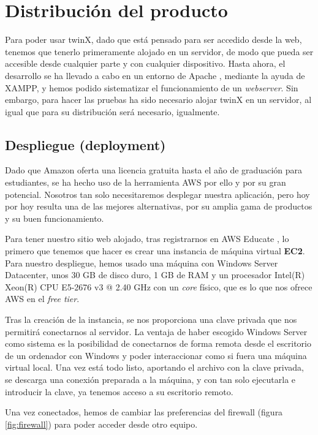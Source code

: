 \chapter{Distribución del producto}

Para poder usar twinX, dado que está pensado para ser accedido desde la web, tenemos que tenerlo primeramente alojado en un servidor, de modo que pueda ser accesible desde cualquier parte y con cualquier dispositivo. Hasta ahora, el desarrollo se ha llevado a cabo en un entorno de Apache \cite{apache}, mediante la ayuda de XAMPP, y  hemos podido sistematizar el funcionamiento de un \textit{webserver}. Sin embargo, para hacer las pruebas ha sido necesario alojar twinX en un servidor, al igual que para su distribución será necesario, igualmente.

\section{Despliegue (deployment)}

Dado que Amazon oferta una licencia gratuita hasta el año de graduación para estudiantes, se ha hecho uso de la herramienta AWS \cite{aws} por ello y por su gran potencial. Nosotros tan solo necesitaremos desplegar nuestra aplicación, pero hoy por hoy resulta una de las mejores alternativas, por su amplia gama de productos y su buen funcionamiento.

Para tener nuestro sitio web alojado, tras registrarnos en AWS Educate \cite{awseducate}, lo primero que tenemos que hacer es crear una instancia de máquina virtual \textbf{EC2}. Para nuestro despliegue, hemos usado una máquina con Windows Server Datacenter, unos 30 GB de disco duro, 1 GB de RAM y un procesador Intel(R) Xeon(R) CPU E5-2676 v3 @ 2.40 GHz con un \textit{core} físico, que es lo que nos ofrece AWS en el \textit{free tier}.

Tras la creación de la instancia, se nos proporciona una clave privada que nos permitirá conectarnos al servidor. La ventaja de haber escogido Windows Server como sistema es la posibilidad de conectarnos de forma remota desde el escritorio de un ordenador con Windows y poder interaccionar como si fuera una máquina virtual local. Una vez está todo listo, aportando el archivo con la clave privada, se descarga una conexión preparada a la máquina, y con tan solo ejecutarla e introducir la clave, ya tenemos acceso a su escritorio remoto.

Una vez conectados, hemos de cambiar las preferencias del firewall (figura \ref{fig:firewall}) para poder acceder desde otro equipo. 

